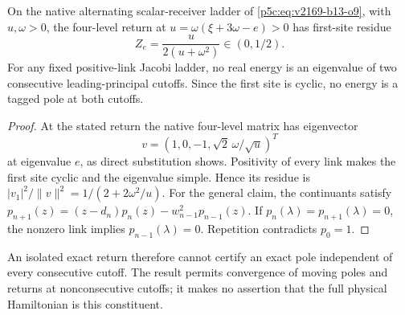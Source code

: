 \documentclass[11pt,a4paper]{article}
\begin{document}
\begin{proposition}
\label{p5c:prop:v246-native-jacobi-residue-cutoff}
On the native alternating scalar-receiver ladder of
\eqref{p5c:eq:v2169-b13-o9}, with $u,\omega>0$, the four-level
return at $u=\omega(\xi+3\omega-e)>0$ has first-site residue
\[
 \boxed{Z_e=\frac{u}{2(u+\omega^2)}\in(0,1/2).}
\]
For any fixed positive-link Jacobi ladder, no real energy is an
eigenvalue of two consecutive leading-principal cutoffs. Since the
first site is cyclic, no energy is a tagged pole at both cutoffs.
\end{proposition}
\begin{proof}
At the stated return the native four-level matrix has eigenvector
\[
 v=(1,0,-1,\sqrt2\,\omega/\sqrt u)^T
\]
at eigenvalue $e$, as direct substitution shows. Positivity of every
link makes the first site cyclic and the eigenvalue simple. Hence its
residue is $|v_1|^2/\|v\|^2=1/(2+2\omega^2/u)$.
For the general claim, the continuants satisfy
$p_{n+1}(z)=(z-d_n)p_n(z)-w_{n-1}^2p_{n-1}(z)$.
If $p_n(\lambda)=p_{n+1}(\lambda)=0$, the nonzero link implies
$p_{n-1}(\lambda)=0$. Repetition contradicts $p_0=1$.
\end{proof}
An isolated exact return therefore cannot certify an exact pole
independent of every consecutive cutoff. The result permits convergence
of moving poles and returns at nonconsecutive cutoffs; it makes no
assertion that the full physical Hamiltonian is this constituent.
\end{document}
